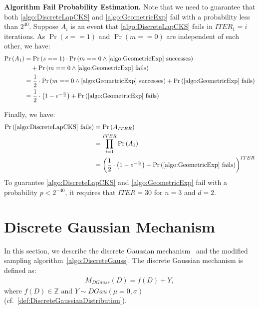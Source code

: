 \textbf{Algorithm Fail Probability Estimation.}
Note that we need to guarantee that both \autoref{algo:DiscreteLapCKS} and \autoref{algo:GeometricExp} fail with a probability less than $2^{40}$.
Suppose $A_i$ is an event that \autoref{algo:DiscreteLapCKS} fails in $ITER_1=i$ iterations.
As $\Pr\left(s==1\right)$ and $\Pr\left(m==0\right)$ are independent of each other, we have:
\begin{equation}
    \begin{split}
        \Pr\left(A_1\right) &=        \Pr\left(s==1\right) \cdot \Pr\left(m==0 \land \autoref{algo:GeometricExp} \text{ successes}  \right)\\
        &\quad +\Pr\left(m==0 \land \autoref{algo:GeometricExp} \text{ fails}  \right)\\
        &=  \frac{1}{2}\cdot \Pr\left(m==0 \land \autoref{algo:GeometricExp} \text{ successes}  \right)+\Pr\left( \autoref{algo:GeometricExp} \text{ fails}  \right)\\
        &=\frac{1}{2}\cdot\left(1-e^{-\frac{n}{d}}\right) + \Pr\left( \autoref{algo:GeometricExp}\text{ fails} \right)
    \end{split}
\end{equation}

Finally, we have:
\begin{equation}
    \begin{split}
        \Pr\left( \autoref{algo:DiscreteLapCKS} \text{ fails} \right) &=  \Pr\left(A_{ITER}\right) \\
        &=\prod _{i=1}^{ITER}\Pr\left(A_1\right)\\
        &= \left(\frac{1}{2} \cdot \left(1-e^{-\frac{n}{d}}\right) + \Pr\left( \autoref{algo:GeometricExp}\text{ fails} \right)\right)^{ITER}
    \end{split}
\end{equation}
To guarantee \autoref{algo:DiscreteLapCKS} and \autoref{algo:GeometricExp} fail with a probability $p<2^{-40}$, it requires that $ITER=30$ for $n=3$ and $d=2$.

\section{Discrete Gaussian Mechanism}
\label{sec:DiscreteGaussianMechanism}
In this section, we describe the discrete Gaussian mechanism~\cite{canonne2020discrete} and the modified sampling algorithm~\autoref{algo:DiscreteGauss}.
The discrete Gaussian mechanism is defined as:
\begin{equation}
    \begin{split}
        M_{DGauss}\left(D\right)=f\left(D\right)+Y,
    \end{split}
\end{equation}
where $f\left(D\right)\in \mathbb{Z} $ and $Y\sim DGau \left(\mu=0,\sigma\right)$ (cf.~\autoref{def:DiscreteGaussianDistribution}).

